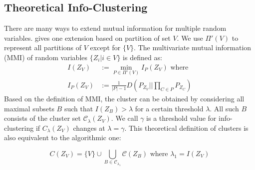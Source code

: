 \subsection{Theoretical Info-Clustering}
There are many ways to extend mutual information for multiple random variables. \cite{ic2016} gives one extension based on partition of set $V$. We use $\Pi'(V)$ to represent all partitions of $V$ except for $\{V\}$. The multivariate mutual information (MMI) of random variables $\{Z_i | i \in V\}$ is defined as:
\begin{align}\label{eq:IZV}
I(Z_V) &:= \min_{P \in \Pi'(V)} I_{P}(Z_V) \textrm{ where} \\
I_P(Z_V) &:= \frac{1}{|P| - 1}D(P_{Z_V} || \prod_{C\in P} P_{Z_C})
\end{align}
Based on the definition of MMI, the cluster can be obtained by considering all maximal subsets $B$ such that $I(Z_B) > \lambda$ for a certain threshold $\lambda$. All such $B$ consists of the cluster set $\mathcal{C}_{\lambda}(Z_V)$. We call $\gamma$ is a threshold value for info-clustering if $C_{\lambda}(Z_V)$ changes at $\lambda=\gamma$.
This theoretical definition of clusters is also equivalent to the algorithmic one:

\begin{equation}\label{eq:CZV}
C(Z_V) = \{ V\} \cup \bigcup_{B \in \mathcal{C}_{\lambda_1}} \mathcal{C}(Z_B) \textrm{ where } \lambda_1 = I(Z_V)
\end{equation}

